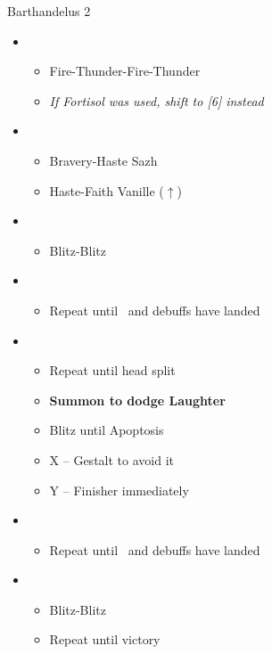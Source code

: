 \begin{battle}{Barthandelus 2}
	\begin{itemize}
		\item \fifth
			\begin{itemize}
				\item Fire-Thunder-Fire-Thunder
				\item \textit{If Fortisol was used, shift to [6] instead}
			\end{itemize}
		\item \first
			\begin{itemize}
				\item Bravery-Haste Sazh
				\item Haste-Faith Vanille ($\uparrow$)
			\end{itemize}	
		\item \sixth
			\begin{itemize}
				\item Blitz-Blitz
			\end{itemize}	
		\item \fifth
			\begin{itemize}
				\item Repeat until \stagger~and debuffs have landed
			\end{itemize}	
		\item \second
			\begin{itemize}
				\item Repeat until head split
				\item \textbf{Summon to dodge Laughter}
				\item Blitz until Apoptosis
				\item X -- Gestalt to avoid it
				\item Y -- Finisher immediately
			\end{itemize}	
		\item \fifth
			\begin{itemize}
				\item Repeat until \stagger~and debuffs have landed
			\end{itemize}	
		\item \sixth
			\begin{itemize}
				\item Blitz-Blitz
				\item Repeat until victory
			\end{itemize}																
	\end{itemize}
\end{battle}